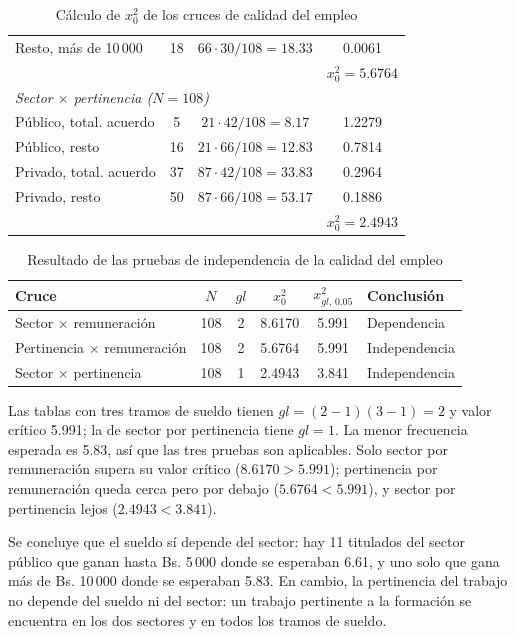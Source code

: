 \documentclass[12pt, a4paper]{article}
\newenvironment{mitabla}[2][H]{%
  \begin{table}[#1]
  \centering
  \caption{#2}
  \small
}{%
  \end{table}
}
\begin{document}
\begin{mitabla}{Cálculo de $x_0^2$ de los cruces de calidad del empleo}
\begin{tabular}{lccc}
Resto, más de 10\,000 & 18 & $66 \cdot 30/108 = 18.33$ & 0.0061 \\
 & & & $x_0^2 = 5.6764$ \\
\midrule
\multicolumn{4}{l}{\textit{Sector $\times$ pertinencia ($N = 108$)}} \\
Público, total. acuerdo & 5 & $21 \cdot 42/108 = 8.17$ & 1.2279 \\
Público, resto & 16 & $21 \cdot 66/108 = 12.83$ & 0.7814 \\
Privado, total. acuerdo & 37 & $87 \cdot 42/108 = 33.83$ & 0.2964 \\
Privado, resto & 50 & $87 \cdot 66/108 = 53.17$ & 0.1886 \\
 & & & $x_0^2 = 2.4943$ \\
\bottomrule
\end{tabular}
\end{mitabla}
\begin{mitabla}{Resultado de las pruebas de independencia de la calidad del empleo}\label{tab:a3-indep}
\begin{tabular}{lccccl}
\toprule
\textbf{Cruce} & \textbf{$N$} & \textbf{$gl$} & \textbf{$x_0^2$} & \textbf{$x^2_{gl,\,0.05}$} & \textbf{Conclusión} \\
\midrule
Sector $\times$ remuneración & 108 & 2 & 8.6170 & 5.991 & Dependencia \\
Pertinencia $\times$ remuneración & 108 & 2 & 5.6764 & 5.991 & Independencia \\
Sector $\times$ pertinencia & 108 & 1 & 2.4943 & 3.841 & Independencia \\
\bottomrule
\end{tabular}
\end{mitabla}

Las tablas con tres tramos de sueldo tienen $gl = (2-1)(3-1) = 2$ y
valor crítico 5.991; la de sector por pertinencia tiene $gl = 1$. La
menor frecuencia esperada es 5.83, así que las tres pruebas son
aplicables. Solo sector por remuneración supera su valor crítico
($8.6170 > 5.991$); pertinencia por remuneración queda cerca pero por
debajo ($5.6764 < 5.991$), y sector por pertinencia lejos ($2.4943 <
3.841$).

Se concluye que el sueldo sí depende del sector: hay 11 titulados del
sector público que ganan hasta Bs. 5\,000 donde se esperaban 6.61, y uno
solo que gana más de Bs. 10\,000 donde se esperaban 5.83. En cambio, la
pertinencia del trabajo no depende del sueldo ni del sector: un trabajo
pertinente a la formación se encuentra en los dos sectores y en todos los
tramos de sueldo.
\end{document}
